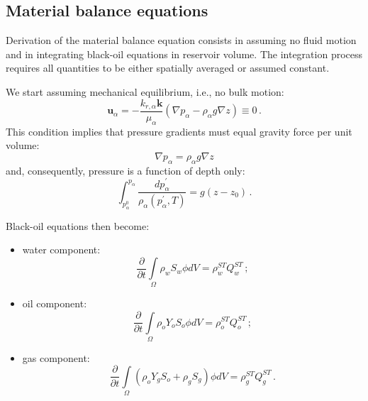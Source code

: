 \documentclass[authoryear,preprint,review,12pt]{elsarticle}
\begin{document}
\subsection{Material balance equations}

Derivation of the material balance equation consists in assuming no fluid motion and in integrating black-oil equations in reservoir volume. The integration process requires all quantities to be either spatially averaged or assumed constant.




We start assuming mechanical equilibrium, i.e., no bulk motion:
\begin{equation}
\mathbf{u}_\alpha = -\frac{k_{r,\alpha} \mathbf{k}}{\mu_\alpha} \left(\nabla p_\alpha - \rho_\alpha g\nabla z\right)\equiv 0 \, .
\end{equation}
This condition implies that pressure gradients must equal gravity force per unit volume:
\begin{equation}\label{eq: p=rhogh}
\nabla p_\alpha = \rho_\alpha g\nabla z
\end{equation}
and, consequently, pressure is a function of depth only:
\begin{equation}\label{eq: p=rhogh}
\int_{p_\alpha^0}^{p_\alpha} \frac{dp_\alpha^{'}}{\rho_\alpha \left(p_\alpha^{'},T\right)} = g\left(z - z_0\right) \, .
\end{equation}

Black-oil equations then become:
\begin{itemize}
\item water component:
\begin{equation}\label{eq: Sw2}
\frac{\partial}{\partial t} \int\limits_{\Omega} \rho_w S_w \phi dV = \rho_w^{ST}Q_w^{ST} \, ;
\end{equation}

\item oil component:
\begin{equation}\label{eq: So2}
\frac{\partial}{\partial t} \int\limits_{\Omega} \rho_o Y_o S_o \phi dV = \rho_o^{ST}Q_o^{ST} \, ;
\end{equation}

\item gas component:
\begin{equation}\label{eq: Sg2}
\frac{\partial}{\partial t} \int\limits_{\Omega} \left( \rho_o Y_g S_o + \rho_g S_g\right) \phi dV = \rho_g^{ST}Q_g^{ST} \, .
\end{equation}
\end{itemize}
%
\end{document}
